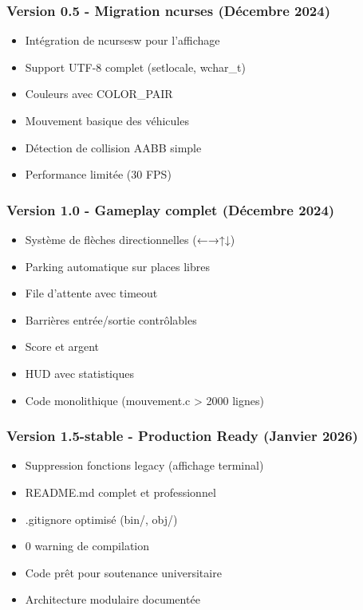\documentclass[12pt,a4paper]{article}
\begin{document}
\subsubsection{Version 0.5 - Migration ncurses (Décembre 2024)}
\begin{itemize}
    \item[$\checkmark$] Intégration de ncursesw pour l'affichage
    \item[$\checkmark$] Support UTF-8 complet (setlocale, wchar\_t)
    \item[$\checkmark$] Couleurs avec COLOR\_PAIR
    \item[$\checkmark$] Mouvement basique des véhicules
    \item[$\checkmark$] Détection de collision AABB simple
    \item[$\sim$] Performance limitée (30 FPS)
\end{itemize}

\subsubsection{Version 1.0 - Gameplay complet (Décembre 2024)}
\begin{itemize}
    \item[$\checkmark$] Système de flèches directionnelles (←→↑↓)
    \item[$\checkmark$] Parking automatique sur places libres
    \item[$\checkmark$] File d'attente avec timeout
    \item[$\checkmark$] Barrières entrée/sortie contrôlables
    \item[$\checkmark$] Score et argent
    \item[$\checkmark$] HUD avec statistiques
    \item[$\sim$] Code monolithique (mouvement.c > 2000 lignes)
\end{itemize}

\subsubsection{Version 1.5-stable - Production Ready (Janvier 2026)}
\begin{itemize}
    \item[$\checkmark$] Suppression fonctions legacy (affichage terminal)
    \item[$\checkmark$] README.md complet et professionnel
    \item[$\checkmark$] .gitignore optimisé (bin/, obj/)
    \item[$\checkmark$] 0 warning de compilation
    \item[$\checkmark$] Code prêt pour soutenance universitaire
    \item[$\checkmark$] Architecture modulaire documentée
\end{itemize}
\end{document}
